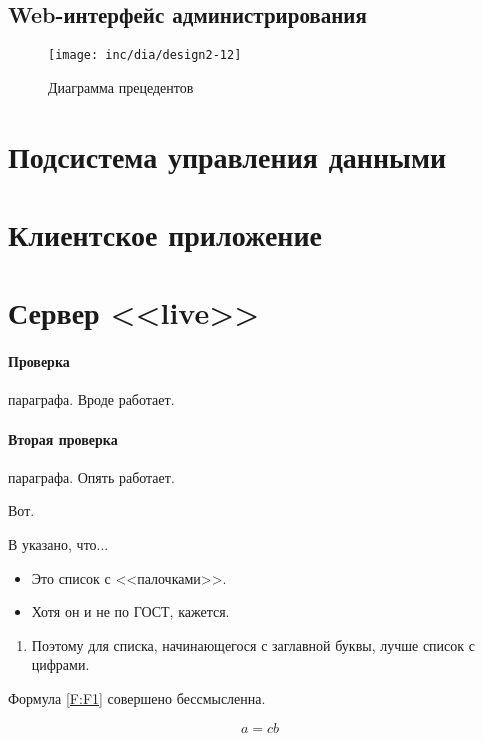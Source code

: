 \subsection{Web-интерфейс администрирования}

\begin{figure}
  \centering  
  \texttt{[image: inc/dia/design2-12]}
  \caption{Диаграмма прецедентов}
  \label{fig:11}
\end{figure}
\section{Подсистема управления данными}

\section{Клиентское приложение}

\section{Сервер <<live>>}

\paragraph{Проверка} параграфа. Вроде работает.
\paragraph{Вторая проверка} параграфа. Опять работает.

Вот.

В \cite{Pup09} указано, что...

\begin{itemize}
\item Это список с <<палочками>>.
\item Хотя он и не по ГОСТ, кажется.
\end{itemize}

\begin{enumerate}
\item Поэтому для списка, начинающегося с заглавной буквы, лучше список с цифрами.
\end{enumerate}

Формула \ref{F:F1} совершено бессмысленна.


\begin{equation}
a= cb
\label{F:F1}
\end{equation}


